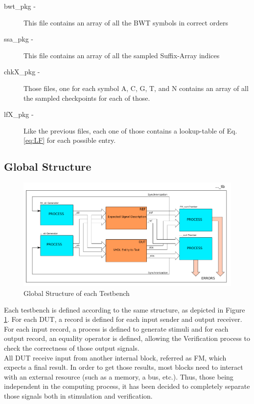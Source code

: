 \begin{description}
\item [bwt\_pkg -] This file contains an array of all the BWT symbols in correct orders
\item [ssa\_pkg -] This file contains an array of all the sampled Suffix-Array indices
\item [chkX\_pkg -] Those files, one for each symbol A, C, G, T, and N contains an array of all the sampled checkpoints for each of those.
\item [lfX\_pkg -] Like the previous files, each one of those contains a lookup-table of Eq. \ref{eq:LF} for each possible entry.
\end{description}

\subsection{Global Structure}

\begin{figure}[H]
 \includegraphics[scale = 0.4]{Figures/TB_struct.png}
    \caption{Global Structure of each Testbench}
    \label{fig:Tb_struct}
\end{figure}

Each testbench is defined according to the same structure, as depicted in Figure \ref{fig:Tb_struct}. For each DUT, a record is defined for each input sender and output receiver. For each input record, a process is defined to generate stimuli and for each output record, an equality operator is defined, allowing the \textrm{Verification} process to check the correctness of those output signals. \\
All DUT receive input from another internal block, referred as FM, which expects a final result. In order to get those results, most blocks need to interact with an external resource (such as a memory, a bus, etc.). Thus, those being independent in the computing process, it has been decided to completely separate those signals both in stimulation and verification. \\

